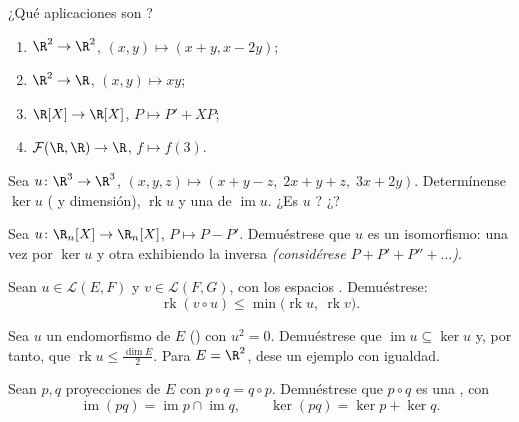\begin{exercise}[$\star$]\label{exo:b1:linmaps:1}
¿Qué aplicaciones son ?
\begin{enumerate}
  \item $\R^2 \to \R^2$, $(x, y) \mapsto (x + y, x - 2y)$;
  \item $\R^2 \to \R$, $(x, y) \mapsto xy$;
  \item $\R[X] \to \R[X]$, $P \mapsto P' + XP$;
  \item $\mathcal{F}(\R,\R) \to \R$, $f \mapsto f(3)$.
\end{enumerate}
\end{exercise}

\begin{exercise}[$\star$]\label{exo:b1:linmaps:2}
Sea $u \colon \R^3 \to \R^3$,
$(x,y,z) \mapsto (x + y - z,\; 2x + y + z,\; 3x + 2y)$. Determínense
$\ker u$ ( y dimensión), $\operatorname{rk} u$ y una  de
$\operatorname{im} u$. ¿Es $u$ ? ¿?
\end{exercise}

\begin{exercise}[$\star$]\label{exo:b1:linmaps:3}
Sea $u \colon \R_n[X] \to \R_n[X]$, $P \mapsto P - P'$. Demuéstrese
que $u$ es un isomorfismo: una vez por $\ker u$ y otra exhibiendo la
inversa \emph{(considérese $P + P' + P'' + \dots$)}.
\end{exercise}

\begin{exercise}[$\star$]\label{exo:b1:linmaps:4}
Sean $u \in \mathcal{L}(E, F)$ y $v \in \mathcal{L}(F, G)$, con los
espacios . Demuéstrese:
\[
\operatorname{rk}(v \circ u) \leq
\min\bigl(\operatorname{rk} u,\ \operatorname{rk} v\bigr).
\]
\end{exercise}

\begin{exercise}[$\star\star$]\label{exo:b1:linmaps:5}
Sea $u$ un endomorfismo de $E$ () con $u^2 = 0$.
Demuéstrese que $\operatorname{im} u \subseteq \ker u$ y, por tanto,
que $\operatorname{rk} u \leq \frac{\dim E}{2}$. Para $E = \R^2$,
dese un ejemplo con igualdad.
\end{exercise}

\begin{exercise}[$\star\star$]\label{exo:b1:linmaps:6}
Sean $p, q$ proyecciones de $E$ con $p \circ q = q \circ p$.
Demuéstrese que $p \circ q$ es una , con
\[
\operatorname{im}(pq) = \operatorname{im} p \cap \operatorname{im}
q ,
\qquad
\ker (pq) = \ker p + \ker q .
\]
\end{exercise}

